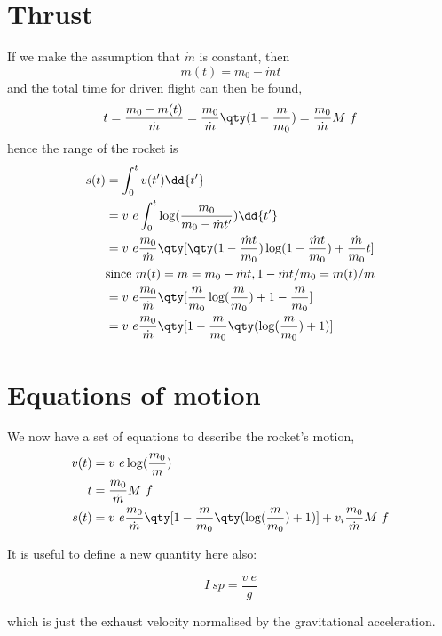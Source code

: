 \section{Thrust}
\label{sec:thrust}

If we make the assumption that $\dot{m}$ is constant, then
\[ m(t) = m_0 - \dot{m} t \]
and the total time for driven flight can then be found,
\begin{equation}
  \label{eq:14}
  t = \frac{m_0 - m(t)}{\dot{m}} = \frac{m_0}{\dot{m}} \qty( 1 - \frac{m}{m_0}) = \frac{m_0}{\dot{m}} M~f
\end{equation}
hence the range of the rocket is
\begin{align*}
  s(t) &= \int_0^t v(t') \dd{t'}\\ &= v~e \int_0^t \log( \frac{m_0}{m_0 - \dot{m} t'} ) \dd{t'} \\ &= v~e \frac{m_0}{\dot{m}}
\qty[\qty(1- \frac{\dot{m} t}{m_0}) \log( 1 - \frac{\dot{m} t}{m_0}) + \frac{\dot{m}}{m_0} t]\\
& \text{since } m(t) = m = m_0 - \dot{m} t, 1- \dot{m} t / m_0 = m(t)/m\\
&= v~e \frac{m_0}{\dot{m}} \qty[ \frac{m}{m_0} \log( \frac{m}{m_0}) +  1 - \frac{m}{m_0}] \\ 
&= v~e \frac{m_0}{\dot{m}} \qty[ 1 - \frac{m}{m_0} \qty( \log(\frac{m}{m_0}) + 1 )]
\end{align*}

\section{Equations of motion}
\label{sec:equations-motion}

We now have a set of equations to describe the rocket's motion,
\begin{align}
  \label{eq:15}
  v(t) &= v~e \log( \frac{m_0}{m} ) \\
  \label{eq:16}
  t &= \frac{m_0}{\dot{m}} M~f \\
  \label{eq:17}
  s(t) &= v~e \frac{m_0}{\dot{m}} \qty[1 - \frac{m}{m_0} \qty(\log( \frac{m}{m_0} )+1)] + v_i \frac{m_0}{\dot{m}} M~f
\end{align}

It is useful to define a new quantity here also:
\begin{definition}
\label{def:specific-impulse}
  \[ I~{sp} = \frac{v~e}{g} \]
\end{definition}
which is just the exhaust velocity normalised by the gravitational
acceleration.

